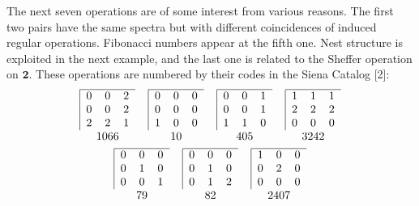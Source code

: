 \documentclass[a4paper,reqno]{amsart}\usepackage{amssymb,latexsym}
\theoremstyle{definition}
\theoremstyle{remark}
\numberwithin{equation}{section}
\numberwithin{theorem}{section}
\begin{document}
The next seven operations are of some interest from various reasons. The first
two pairs have the same spectra but with different coincidences of induced
regular operations. Fibonacci numbers appear at the fifth one. Nest structure
is exploited in the next example, and the last one is related to the Sheffer
operation on $\mathbf{2}$. These operations are numbered by their codes in the
Siena Catalog [2]:
\begin{gather*}
\setlength{\tabcolsep}{0.2cm}\begin{tabular}
[c]{cccc}$\begin{tabular}
[c]{|ccc}\hline
$0$ & $0$ & $2$\\
$0$ & $0$ & $2$\\
$2$ & $2$ & $1$\end{tabular}
$ & $\begin{tabular}
[c]{|ccc}\hline
$0$ & $0$ & $0$\\
$0$ & $0$ & $0$\\
$1$ & $0$ & $0$\end{tabular}
$ & $\begin{tabular}
[c]{|ccc}\hline
$0$ & $0$ & $1$\\
$0$ & $0$ & $1$\\
$1$ & $1$ & $0$\end{tabular}
$ & $\begin{tabular}
[c]{|ccc}\hline
$1$ & $1$ & $1$\\
$2$ & $2$ & $2$\\
$0$ & $0$ & $0$\end{tabular}
$\\
$1066$ & $10$ & $405$ & $3242$\end{tabular}
\\
\setlength{\tabcolsep}{0.2cm}\begin{tabular}
[c]{ccc}$\begin{tabular}
[c]{|ccc}\hline
$0$ & $0$ & $0$\\
$0$ & $1$ & $0$\\
$0$ & $0$ & $1$\end{tabular}
$ & $\begin{tabular}
[c]{|ccc}\hline
$0$ & $0$ & $0$\\
$0$ & $1$ & $0$\\
$0$ & $1$ & $2$\end{tabular}
$ & $\begin{tabular}
[c]{|ccc}\hline
$1$ & $0$ & $0$\\
$0$ & $2$ & $0$\\
$0$ & $0$ & $0$\end{tabular}
$\\
$79$ & $82$ & $2407$\end{tabular}
\end{gather*}
\end{document}
